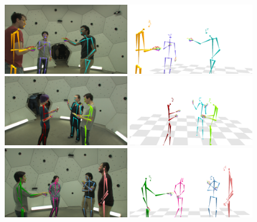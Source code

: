 \begin{figure}[h]
	\centering
	\includegraphics[trim=0 0 140 70,clip,width=0.49\textwidth]{figures/fullmocap/00000}
	\includegraphics[trim=0 0 140 70,clip,width=0.49\textwidth]{figures/fullmocap/00002}
	\includegraphics[trim=70 0 70 70,clip,width=0.49\textwidth]{figures/fullmocap/00008}
	\includegraphics[trim=70 0 70 70,clip,width=0.49\textwidth]{figures/fullmocap/00009}
	\includegraphics[trim=70 0 70 70,clip,width=0.49\textwidth]{figures/fullmocap/frm_04541}
	\includegraphics[trim=70 0 70 70,clip,width=0.49\textwidth]{figures/fullmocap/frm_04541-2}

\end{figure}
